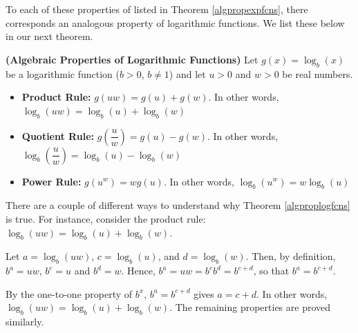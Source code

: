 \documentclass{ximera}
\begin{document}
\smallskip

 To each of these properties of listed in Theorem \ref{algpropexpfcns}, there corresponds an analogous property of logarithmic functions.  We list these below in our next theorem.

\smallskip

\colorbox{ResultColor}{\bbm

\begin{thm}  \label{algproplogfcns} \textbf{(Algebraic Properties of Logarithmic Functions)}  Let $g(x) =\log_{b}(x)$ be a logarithmic function ($b > 0$, $b\neq 1$) and let $u>0$ and $w>0$ be real numbers. 

\begin{itemize}

\item  \textbf{Product Rule:}  $g(uw) = g(u)+ g(w)$.  In other words, $\log_{b}(uw) = \log_{b}(u) + \log_{b}(w)$

\item  \textbf{Quotient Rule:}  $g\left(\dfrac{u}{w} \right) = g(u) - g(w)$.  In other words, $\log_{b} \left( \dfrac{u}{w} \right) = \log_{b}(u) - \log_{b}(w)$

\item  \textbf{Power Rule:}  $g\left(u^{w}\right) =w g(u)$.  In other words, $\log_{b}\left(u^{w}\right) = w \log_{b}(u)$

\end{itemize}

\end{thm}

\ebm}

\smallskip

There are a couple of different ways to understand why Theorem \ref{algproplogfcns} is true.  For instance, consider  the product rule: $\log_{b}(uw) = \log_{b}(u) + \log_{b}(w)$.  

\smallskip

Let $a = \log_{b}(uw)$, $c = \log_{b}(u)$, and $d = \log_{b}(w)$.  Then, by definition, $b^{a} = uw$, $b^{c} = u$ and $b^{d} = w$.  Hence, $b^{a} = uw = b^{c} b^{d} = b^{c+d}$, so that $b^{a} = b^{c+d}$. 

\smallskip

By the one-to-one property of $b^{x}$,  $b^{a} = b^{c+d}$ gives $a = c+d$. In other words, $\log_{b}(uw) = \log_{b}(u) + \log_{b}(w)$.  The remaining properties are proved similarly.  
\end{document}
